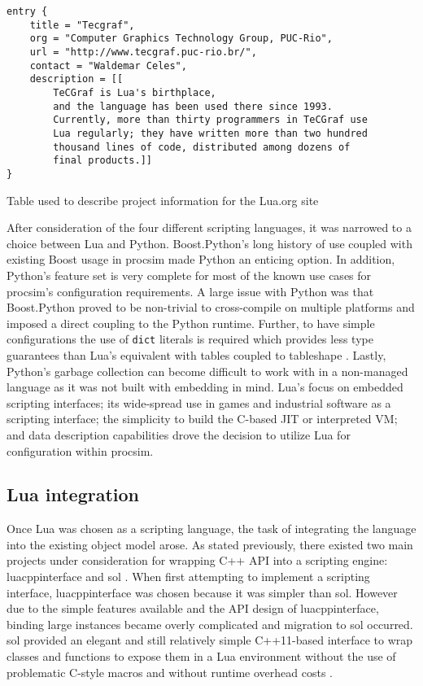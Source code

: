 \begin{listing}[b!]
\begin{verbatim}
entry {
    title = "Tecgraf",
    org = "Computer Graphics Technology Group, PUC-Rio",
    url = "http://www.tecgraf.puc-rio.br/",
    contact = "Waldemar Celes",
    description = [[
        TeCGraf is Lua's birthplace,
        and the language has been used there since 1993.
        Currently, more than thirty programmers in TeCGraf use
        Lua regularly; they have written more than two hundred
        thousand lines of code, distributed among dozens of
        final products.]]
}
\end{verbatim}
\caption{Table used to describe project information for the Lua.org site \cite{Ierusalimschy:PIL}}
\label{lst:lua:project-example}
\end{listing}

After consideration of the four different scripting languages, it was narrowed to a choice between Lua and Python. Boost.Python's long history of use coupled with existing Boost usage in procsim made Python an enticing option. In addition, Python's feature set is very complete for most of the known use cases for procsim's configuration requirements. A large issue with Python was that Boost.Python proved to be non-trivial to cross-compile on multiple platforms and imposed a direct coupling to the Python runtime. Further, to have simple configurations the use of \texttt{dict} literals is required which provides less type guarantees than Lua's equivalent with tables coupled to tableshape \cite{Python:BuiltinTypes, Ierusalimschy:PIL, Github:leafto:tableshape}. Lastly, Python's garbage collection can become difficult to work with in a non-managed language as it was not built with embedding in mind. Lua's focus on embedded scripting interfaces; its wide-spread use in games and industrial software as a scripting interface; the simplicity to build the C-based JIT or interpreted VM; and data description capabilities drove the decision to utilize Lua for configuration within procsim. 

\subsection{Lua integration}

Once Lua was chosen as a scripting language, the task of integrating the language into the existing object model arose. As stated previously, there existed two main projects under consideration for wrapping C++ API into a scripting engine: luacppinterface and sol \cite{Github:davidsiaw:luacppinterface, Github:Rapptz:Sol}. When first attempting to implement a scripting interface, luacppinterface was chosen because it was simpler than sol. However due to the simple features available and the API design of luacppinterface, binding large  instances became overly complicated and migration to sol occurred. sol provided an elegant and still relatively simple C++11-based interface to wrap classes and functions to expose them in a Lua environment without the use of problematic C-style macros and without runtime overhead costs \cite{Github:Rapptz:Sol}.

